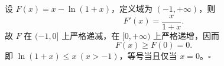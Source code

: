 设 $F(x)=x-\ln(1+x)$，定义域为 $(-1,+\infty)$，则
\[
 F'(x)=\frac{x}{1+x}.
\]
故 $F$ 在 $(-1,0]$ 上严格递减，在 $[0,+\infty)$ 上严格递增，因而
\[
 F(x)\ge F(0)=0.
\]
即 $\boxed{\ln(1+x)\le x\ (x>-1)}$，等号当且仅当 $x=0$。$\square$

